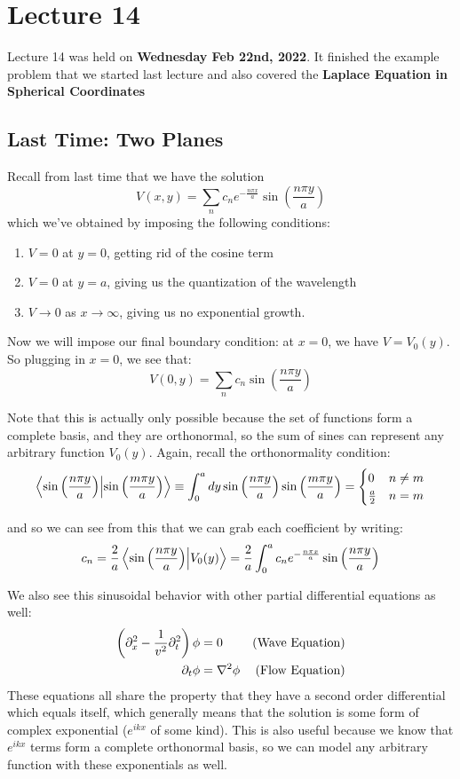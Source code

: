 \chapter{Lecture 14}
Lecture 14 was held on \textbf{Wednesday Feb 22nd, 2022}. It finished the example problem that we started last
lecture and also covered the \textbf{Laplace Equation in Spherical Coordinates}

\section{Last Time: Two Planes}
Recall from last time that we have the solution 
\[ V(x, y) = \sum_n c_n e^{-\frac{n \pi x}{a}} \sin \left( \frac{n \pi y}{a} \right) \] 
which we've obtained by imposing the following conditions:
\begin{enumerate}
		\item $V = 0$ at $y = 0$, getting rid of the cosine term
		\item $V =0$ at $y =a$, giving us the quantization of the wavelength
		\item $V \to 0$ as $x \to \infty$, giving us no exponential growth.
\end{enumerate}
Now we will impose our final boundary condition: at $x = 0$, we have $V = V_0(y)$. So plugging in $x = 0$, we see
that: 
\[ V(0, y) = \sum_n c_n \sin\left( \frac{n \pi y}{a} \right) \]
\begin{insight*}{}
	Note that this is actually only possible because the set of functions form a complete basis, and they are 
	orthonormal, so the sum of sines can represent any arbitrary function $V_0(y)$. Again, recall the 
	orthonormality condition: 
	\[ \braket{\sin\left( \frac{n \pi y}{a} \right)}{\sin\left( \frac{m \pi y}{a} \right) } \equiv \int_0^a
	dy \sin\left( \frac{n \pi y}{a} \right) \sin\left( \frac{m \pi y}{a} \right) = \begin{cases}
			0 & n \neq m\\
	\frac{a}{2} & n = m
\end{cases}\]
\end{insight*}
and so we can see from this that we can grab each coefficient by writing: 
\[ c_n = \frac{2}{a}\braket{\sin\left( \frac{n \pi y}{a} \right) }{V_0(y)} = \frac{2}{a}\int_0^a c_n 
e^{-\frac{n\pi x}{a}} \sin\left( \frac{n \pi y}{a} \right) \]
\begin{insight*}{}
		We also see this sinusoidal behavior with other partial differential equations as well: 
		\begin{align*}
				\left(\partial_x^2 - \frac{1}{v^2}\partial_t^2\right) \phi &= 0 & \text{(Wave Equation)}\\
				\partial_t \phi &= \nabla^2 \phi & \text{(Flow Equation)}
		\end{align*}
		These equations all share the property that they have a second order differential which equals itself, 
		which generally means that the solution is some form of complex exponential ($e^{ikx}$ of some kind). This
		is also useful because  we know that $e^{ikx}$ terms form a complete orthonormal basis, so we can model any
		arbitrary function with these exponentials as well.  
\end{insight*}

